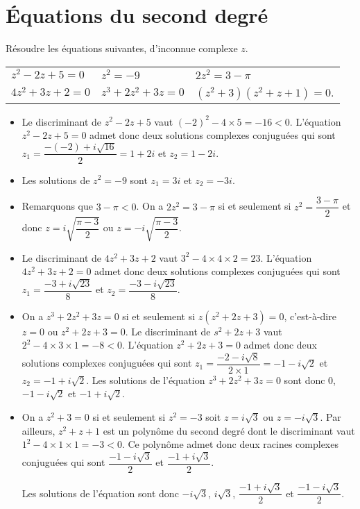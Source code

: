 \documentclass[11pt,fleqn, openany]{book} %
\begin{document}

\section*{Équations du second degré}

\begin{exercise}[topic=cpx04]Résoudre les équations suivantes, d'inconnue complexe $z$.

\begin{tabularx}{\linewidth}{XXX}
$z^2-2z+5=0$ & $z^2=-9$ & $2z^2=3-\pi$ \\
$4z^2+3z+2=0$ & $z^3+2z^2+3z=0$ & $(z^2+3)(z^2+z+1)=0$.
\end{tabularx}\end{exercise}

\begin{solution}\hspace{0pt}

\begin{itemize}
\item Le discriminant de $z^2-2z+5$ vaut $(-2)^2-4 \times 5=-16<0$. L'équation $z^2-2z+5=0$ admet donc deux solutions complexes conjuguées qui sont $z_1=\dfrac{-(-2)+i\sqrt{16}}{2}=1+2i$ et $z_2=1-2i$.
\vskip5pt
\item Les solutions de $z^2=-9$ sont $z_1=3i$ et $z_2=-3i$.
\vskip5pt
\item Remarquons que $3-\pi<0$. On a $2z^2=3-\pi$ si et seulement si $z^2=\dfrac{3-\pi}{2}$ et donc $z=i\sqrt{\dfrac{\pi-3}{2}}$ ou $z=-i\sqrt{\dfrac{\pi-3}{2}}$.
\vskip5pt
\item Le discriminant de $4z^2+3z+2$ vaut $3^2-4 \times 4 \times 2 =23$. L'équation $4z^2+3z+2=0$ admet donc deux solutions complexes conjuguées qui sont $z_1=\dfrac{-3+i\sqrt{23}}{8}$ et $z_2=\dfrac{-3-i\sqrt{23}}{8}$.
\vskip5pt
\item On a $z^3+2z^2+3z=0$ si et seulement si $z(z^2+2z+3)=0$, c'est-à-dire $z=0$ ou $z^2+2z+3=0$. Le discriminant de $s^2+2z+3$ vaut $2^2-4 \times 3 \times 1 =-8<0$. L'équation $z^2+2z+3=0$ admet donc deux solutions complexes conjuguées qui sont $z_1=\dfrac{-2-i\sqrt{8}}{2\times 1}=-1-i\sqrt{2}$ et $z_2=-1+i\sqrt{2}$. Les solutions de l'équation $z^3+2z^2+3z=0$ sont donc 0, $-1-i\sqrt{2}$ et $-1+i\sqrt{2}$.
\vskip5pt
\item On a $z^2+3=0$ si et seulement si $z^2=-3$ soit $z=i\sqrt{3}$ ou $z=-i\sqrt{3}$. Par ailleurs, $z^2+z+1$ est un polynôme du second degré dont le discriminant vaut $1^2-4 \times 1 \times 1 =-3<0$. Ce polynôme admet donc deux racines complexes conjuguées qui sont $\dfrac{-1-i\sqrt{3}}{2}$ et $\dfrac{-1+i\sqrt{3}}{2}$.

Les solutions de l'équation sont donc $-i\sqrt{3}$, $i\sqrt{3}$, $\dfrac{-1+i\sqrt{3}}{2}$ et $\dfrac{-1-i\sqrt{3}}{2}$.
\end{itemize}
\end{solution}
\end{document}
